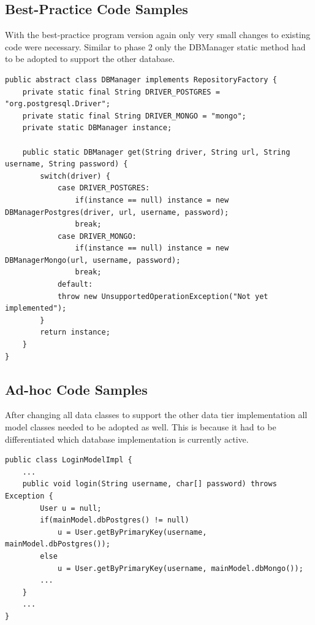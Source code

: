 \subsection{Best-Practice Code Samples}
With the best-practice program version again only very small changes to existing code were necessary. Similar to phase 2 only the DBManager static method had to be adopted to support the other database.

\begin{lstlisting}[caption={DBManager implementation after support for a second database. Again only a branch of the switch-statement has to be added.}, captionpos=b]
public abstract class DBManager implements RepositoryFactory {
	private static final String DRIVER_POSTGRES = "org.postgresql.Driver";
	private static final String DRIVER_MONGO = "mongo";
	private static DBManager instance;
	
	public static DBManager get(String driver, String url, String username, String password) {
		switch(driver) {
			case DRIVER_POSTGRES:
				if(instance == null) instance = new DBManagerPostgres(driver, url, username, password);
				break;
			case DRIVER_MONGO:
				if(instance == null) instance = new DBManagerMongo(url, username, password);
				break;
			default:
			throw new UnsupportedOperationException("Not yet implemented");
		}
		return instance;
	}
}
\end{lstlisting}

\subsection{Ad-hoc Code Samples}
\label{sec:static-code-samples}
After changing all data classes to support the other data tier implementation all model classes needed to be adopted as well. This is because it had to be differentiated which database implementation is currently active. 

\begin{lstlisting}[caption={[Code of the login-process after implementing support of the second database in the ad-hoc version of the program. ]Code of the login-process after implementing support of the second database in the ad-hoc version of the program. Again because the application does not rely on interfaces as in listing \ref{lst:controller-switch} it has to be differentiated each time database access is needed. The methods for database code are overloaded.}, captionpos=b]
public class LoginModelImpl {
	...
	public void login(String username, char[] password) throws Exception {
		User u = null;
		if(mainModel.dbPostgres() != null)
			u = User.getByPrimaryKey(username, mainModel.dbPostgres());
		else
			u = User.getByPrimaryKey(username, mainModel.dbMongo());
		...
	}
	...
}
\end{lstlisting}